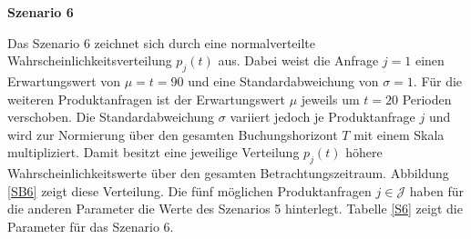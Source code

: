 \textbf{Szenario 6}

Das Szenario 6 zeichnet sich durch eine normalverteilte Wahrscheinlichkeitsverteilung $p_j(t)$ aus. Dabei weist die Anfrage $j=1$ einen Erwartungswert von $\mu=t=90$ und eine Standardabweichung von $\sigma=1$. Für die weiteren Produktanfragen ist der Erwartungswert $\mu$ jeweils um $t=20$ Perioden verschoben. Die Standardabweichung $\sigma$ variiert jedoch je Produktanfrage $j$ und wird zur Normierung über den gesamten Buchungshorizont $T$ mit einem Skala multipliziert. Damit besitzt eine jeweilige Verteilung $p_j(t)$ höhere Wahrscheinlichkeitswerte über den gesamten Betrachtungszeitraum. Abbildung \ref{SB6} zeigt diese Verteilung. Die fünf möglichen Produktanfragen $j\in\mathcal{J}$ haben für die anderen Parameter die Werte des Szenarios 5 hinterlegt. Tabelle \ref{S6} zeigt die Parameter für das Szenario 6.

